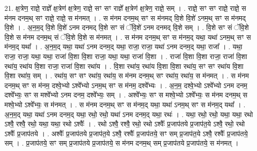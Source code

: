 \documentclass[17pt]{extarticle}
\begin{document}
21. क्ष॒त्रेण॒ राज्ञे॒ राज्ञे᳚ क्ष॒त्रेण॑ क्ष॒त्रेण॒ राज्ञे॒ सꣳ सꣳ राज्ञे᳚ क्ष॒त्रेण॑ क्ष॒त्रेण॒ राज्ञे॒ सम् । . राज्ञे॒ सꣳ सꣳ राज्ञे॒ राज्ञे॒ स म॑नम दनम॒थ् सꣳ राज्ञे॒ राज्ञे॒ स म॑नमत् । . स म॑नम दनम॒थ् सꣳ स म॑नमद् वि॒शे वि॒शे॑ ऽनम॒थ् सꣳ स म॑नमद् वि॒शे । . अ॒न॒म॒द् वि॒शे वि॒शे॑ ऽनम दनमद् वि॒शे सꣳ सं ॅवि॒शे॑ ऽनम दनमद् वि॒शे सम् । . वि॒शे सꣳ सं ॅवि॒शे वि॒शे स म॑नम दनम॒थ् सं ॅवि॒शे वि॒शे स म॑नमत् । . स म॑नम दनम॒थ् सꣳ स म॑नम॒द् यथा॒ यथा॑ ऽनम॒थ् सꣳ स म॑नम॒द् यथा᳚ । . अ॒न॒म॒द् यथा॒ यथा॑ ऽनम दनम॒द् यथा॒ राजा॒ राजा॒ यथा॑ ऽनम दनम॒द् यथा॒ राजा᳚ । . यथा॒ राजा॒ राजा॒ यथा॒ यथा॒ राजा॑ वि॒शा वि॒शा राजा॒ यथा॒ यथा॒ राजा॑ वि॒शा । . राजा॑ वि॒शा वि॒शा राजा॒ राजा॑ वि॒शा रथा॑य॒ रथा॑य वि॒शा राजा॒ राजा॑ वि॒शा रथा॑य । . वि॒शा रथा॑य॒ रथा॑य वि॒शा वि॒शा रथा॑य॒ सꣳ सꣳ रथा॑य वि॒शा वि॒शा रथा॑य॒ सम् । . रथा॑य॒ सꣳ सꣳ रथा॑य॒ रथा॑य॒ स म॑नम दनम॒थ् सꣳ रथा॑य॒ रथा॑य॒ स म॑नमत् । . स म॑नम दनम॒थ् सꣳ स म॑नम॒ दश्वे॒भ्यो ऽश्वे᳚भ्यो ऽनम॒थ् सꣳ स म॑नम॒ दश्वे᳚भ्यः । . अ॒न॒म॒ दश्वे॒भ्यो ऽश्वे᳚भ्यो ऽनम दनम॒ दश्वे᳚भ्यः॒ सꣳ स मश्वे᳚भ्यो ऽनम दनम॒ दश्वे᳚भ्यः॒ सम् । . अश्वे᳚भ्यः॒ सꣳ स मश्वे॒भ्यो ऽश्वे᳚भ्यः॒ स म॑नम दनम॒थ् स मश्वे॒भ्यो ऽश्वे᳚भ्यः॒ स म॑नमत् । . स म॑नम दनम॒थ् सꣳ स म॑नम॒द् यथा॒ यथा॑ ऽनम॒थ् सꣳ स म॑नम॒द् यथा᳚ । . अ॒न॒म॒द् यथा॒ यथा॑ ऽनम दनम॒द् यथा॒ रथो॒ रथो॒ यथा॑ ऽनम दनम॒द् यथा॒ रथः॑ । . यथा॒ रथो॒ रथो॒ यथा॒ यथा॒ रथो ऽश्वै॒ रश्वै॒ रथो॒ यथा॒ यथा॒ रथो ऽश्वैः᳚ । . रथो ऽश्वै॒ रश्वै॒ रथो॒ रथो ऽश्वैः᳚ प्र॒जाप॑तये प्र॒जाप॑त॒ये ऽश्वै॒ रथो॒ रथो ऽश्वैः᳚ प्र॒जाप॑तये । . अश्वैः᳚ प्र॒जाप॑तये प्र॒जाप॑त॒ये ऽश्वै॒ रश्वैः᳚ प्र॒जाप॑तये॒ सꣳ सम् प्र॒जाप॑त॒ये ऽश्वै॒ रश्वैः᳚ प्र॒जाप॑तये॒ सम् । . प्र॒जाप॑तये॒ सꣳ सम् प्र॒जाप॑तये प्र॒जाप॑तये॒ स म॑नम दनम॒थ् सम् प्र॒जाप॑तये प्र॒जाप॑तये॒ स म॑नमत् । \newline
\end{document}
